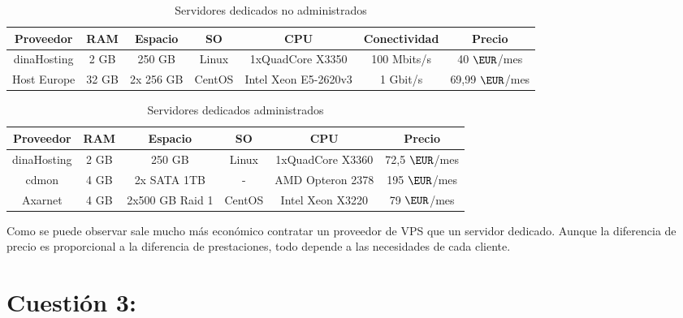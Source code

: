 \begin{table}[H]
\centering
\begin{tabular}{|c|c|c|c|c|c|c|}
\hline
\textbf{Proveedor} & \textbf{RAM} & \textbf{Espacio} & \textbf{SO} & \textbf{CPU}         & \textbf{Conectividad} & \textbf{Precio} \\ \hline
dinaHosting        & 2 GB         & 250 GB           & Linux       & 1xQuadCore X3350     & 100 Mbits/s           & 40 $\EUR$/mes      \\ \hline
Host Europe        & 32 GB        & 2x 256 GB        & CentOS      & Intel Xeon E5-2620v3 & 1 Gbit/s              & 69,99 $\EUR$/mes    \\ \hline
\end{tabular}
\caption{Servidores dedicados no administrados} \label{tab:serAdmin}
\end{table}


\begin{table}[]
\centering
\begin{tabular}{|c|c|c|c|c|c|}
\hline
\textbf{Proveedor} & \textbf{RAM} & \textbf{Espacio} & \textbf{SO} & \textbf{CPU}     & \textbf{Precio} \\ \hline
dinaHosting        & 2 GB         & 250 GB           & Linux       & 1xQuadCore X3360 & 72,5 $\EUR$/mes    \\ \hline
cdmon              & 4 GB         & 2x SATA 1TB      & -           & AMD Opteron 2378 & 195 $\EUR$/mes     \\ \hline
Axarnet            & 4 GB         & 2x500 GB Raid 1  & CentOS      & Intel Xeon X3220 & 79 $\EUR$/mes      \\ \hline
\end{tabular}
\caption{Servidores dedicados administrados} \label{tab:serNoAdmin}
\end{table}


Como se puede observar sale mucho más económico contratar un proveedor de VPS que un servidor dedicado. Aunque la diferencia de precio es proporcional a la diferencia de prestaciones, todo depende a las necesidades de cada cliente.



\section{Cuestión 3:}

